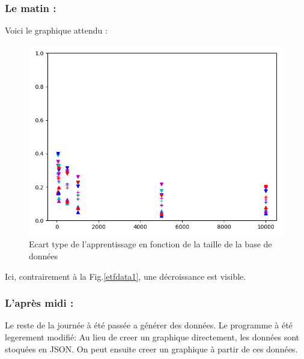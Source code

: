 \subsubsection*{Le matin :}
Voici le graphique attendu :
\begin{figure}[H]
    \center
    \includegraphics[height=\grand]{sources/data/etfdata/graph2}
	\caption{Ecart type de l'apprentissage en fonction de la taille de la base de données}
	\label{etfdata2}
\end{figure}

Ici, contrairement à la Fig.\ref{etfdata1}, une décroissance est visible.

\subsubsection*{L'après midi :}
Le reste de la journée à été passée a générer des données.
Le programme à été legerement modifié:
Au lieu de creer un graphique directement, les données sont stoquées en \textsc{JSON}.
On peut ensuite creer un graphique à partir de ces données.
